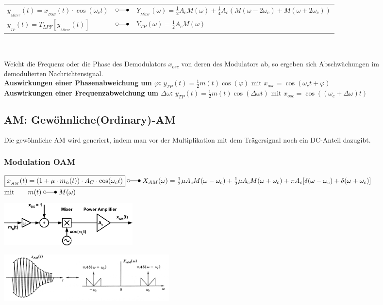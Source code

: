 \begin{tabular}{l l l}
	$y_{_{Mixer}}(t) = x_{_{DSB}}(t) \cdot \cos(\omega_ct)$ & $\laplace$ &  
	$Y_{_{Mixer}}(\omega) = \frac{1}{2} A_c M(\omega) + \frac{1}{4} A_c (M(\omega-2\omega_c) + M(\omega+2\omega_c))$ \\
	$y_{_{TP}}(t) = T_{LPF}[y_{_{Mixer}}(t)] $&$ \laplace $&$ Y_{TP}(\omega) = \frac{1}{2}A_cM(\omega)$ \\
\end{tabular} \\ \\

	Weicht die Frequenz oder die Phase des Demodulators $x_{osc}$ von deren des Modulators ab, 
	so ergeben sich Abschwächungen im demodulierten Nachrichtensignal.\\
\textbf{Auswirkungen einer Phasenabweichung um $\varphi$:} $\boxed{y_{TP}(t) = \frac{1}{2} m(t) \cos(\varphi)} $ mit $x_{osc} = \cos(\omega_c t + \varphi)$ \\
\textbf{Auswirkungen einer Frequenzabweichung um $\Delta \omega$:} $ \boxed{y_{TP}(t) =
\frac{1}{2} m(t) \cos(\Delta \omega t)}$ mit $x_{osc} = \cos((\omega_c + \Delta \omega)t )$ \\

\newpage

\subsection{AM: Gewöhnliche(Ordinary)-AM }
	Die gewöhnliche AM wird generiert, indem man vor der Multiplikation mit dem Trägersignal noch ein DC-Anteil dazugibt.

\subsubsection{Modulation OAM}
	$\boxed{x_{_{AM}}(t) = (1 + \mu \cdot m_n(t)) \cdot A_C \cdot  \cos(\omega_c t)}
	\; \laplace \; X_{AM}(\omega) = \frac{1}{2} \mu A_c M(\omega - \omega_c) + 
	\frac{1}{2} \mu A_c M(\omega + \omega_c) + \pi A_c [\delta (\omega - \omega_c) + 
	\delta (\omega + \omega_c)] $ \\
	$ \text{mit} \qquad m(t) \; \laplace \; M(\omega) $ \\
	
\begin{minipage}[]{9cm}
	\includegraphics[width=7cm]{bilder/am_oam_modulation.png}
\end{minipage}
\begin{minipage}[]{9cm}
    \includegraphics[width=9cm]{bilder/am_oam_spektrum.png}
\end{minipage}\\

